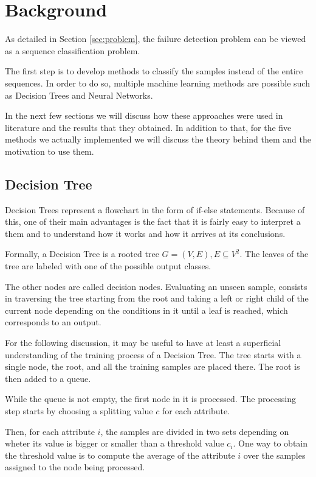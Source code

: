 \chapter{Background}\label{chap:background}

As detailed in Section \ref{sec:problem}, the failure detection problem can be viewed as a sequence classification problem.

The first step is to develop methods to classify the samples instead of the entire sequences.
In order to do so, multiple machine learning methods are possible such as Decision Trees and Neural Networks.

In the next few sections we will discuss how these approaches were used in literature and the results that they obtained.
In addition to that, for the five methods we actually implemented we will discuss the theory behind them and the motivation to use them.

\section{Decision Tree}\label{sec:decisiontree}

Decision Trees represent a flowchart in the form of if-else statements.
Because of this, one of their main advantages is the fact that it is fairly easy to interpret a them and to understand how it works and how it arrives at its conclusions.

Formally, a Decision Tree is a rooted tree $G = (V, E), E \subseteq V^2$.
The leaves of the tree are labeled with one of the possible output classes.

The other nodes are called decision nodes.
Evaluating an unseen sample, consists in traversing the tree starting from the root and taking a left or right child of the current node depending on the conditions in it until a leaf is reached, which corresponds to an output.

For the following discussion, it may be useful to have at least a superficial understanding of the training process of a Decision Tree.
The tree starts with a single node, the root, and all the training samples are placed there.
The root is then added to a queue.

While the queue is not empty, the first node in it is processed.
The processing step starts by choosing a splitting value $c$ for each attribute.

Then, for each attribute $i$, the samples are divided in two sets depending on wheter its value is bigger or smaller than a threshold value $c_i$.
One way to obtain the threshold value is to compute the average of the attribute $i$ over the samples assigned to the node being processed.

